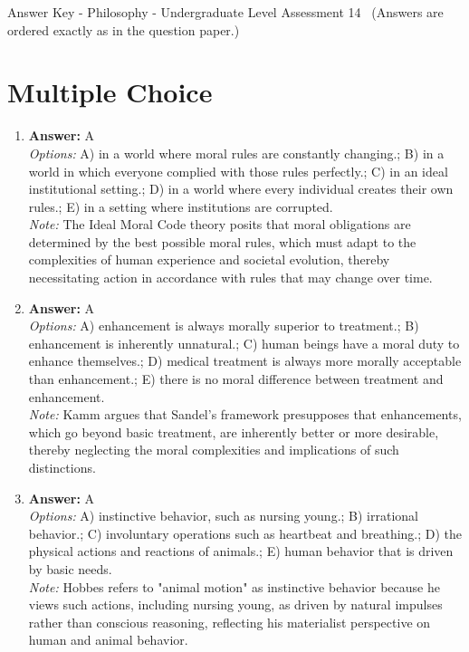 \documentclass[12pt]{article}
\begin{document}
\begin{center}
Answer Key - Philosophy - Undergraduate Level Assessment 14 \
\small (Answers are ordered exactly as in the question paper.)
\end{center}

\section*{Multiple Choice}
\begin{enumerate}[label=\arabic*.]
\item \textbf{Answer:} A
\\ \textit{Options:} A) in a world where moral rules are constantly changing.; B) in a world in which everyone complied with those rules perfectly.; C) in an ideal institutional setting.; D) in a world where every individual creates their own rules.; E) in a setting where institutions are corrupted.
\\ \textit{Note:} The Ideal Moral Code theory posits that moral obligations are determined by the best possible moral rules, which must adapt to the complexities of human experience and societal evolution, thereby necessitating action in accordance with rules that may change over time.
\item \textbf{Answer:} A
\\ \textit{Options:} A) enhancement is always morally superior to treatment.; B) enhancement is inherently unnatural.; C) human beings have a moral duty to enhance themselves.; D) medical treatment is always more morally acceptable than enhancement.; E) there is no moral difference between treatment and enhancement.
\\ \textit{Note:} Kamm argues that Sandel's framework presupposes that enhancements, which go beyond basic treatment, are inherently better or more desirable, thereby neglecting the moral complexities and implications of such distinctions.
\item \textbf{Answer:} A
\\ \textit{Options:} A) instinctive behavior, such as nursing young.; B) irrational behavior.; C) involuntary operations such as heartbeat and breathing.; D) the physical actions and reactions of animals.; E) human behavior that is driven by basic needs.
\\ \textit{Note:} Hobbes refers to "animal motion" as instinctive behavior because he views such actions, including nursing young, as driven by natural impulses rather than conscious reasoning, reflecting his materialist perspective on human and animal behavior.

\end{enumerate}
\end{document}
